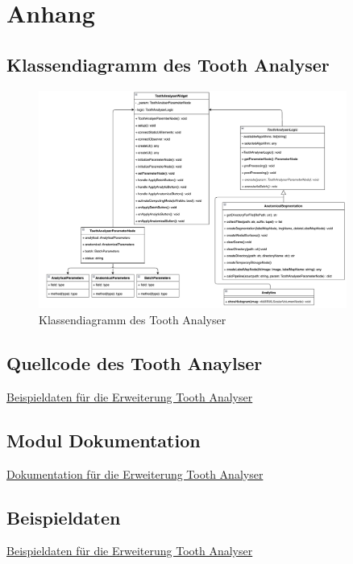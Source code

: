 \chapter{Anhang}
\label{chap:anhang}

\section{Klassendiagramm des Tooth Analyser}
\begin{figure}[h]
	\centering
	\includegraphics[width=0.9\textwidth, angle=90]{img/toothAnalyserClasses.png}
	\caption{Klassendiagramm des Tooth Analyser}
	\label{fig:klassendiagramm_gesamt}
\end{figure}

\section{Quellcode des Tooth Anaylser}
\href{https://github.com/lukaskonietzka/ToothAnalyserSampleData}{Beispieldaten
für die Erweiterung Tooth Analyser}

\section{Modul Dokumentation}
\href{https://github.com/lukaskonietzka/SlicerToothAnalyser/tree/main}{Dokumentation
für die Erweiterung Tooth Analyser}

\section{Beispieldaten}
\href{https://github.com/lukaskonietzka/ToothAnalyserSampleData}{Beispieldaten
für die Erweiterung Tooth Analyser}
